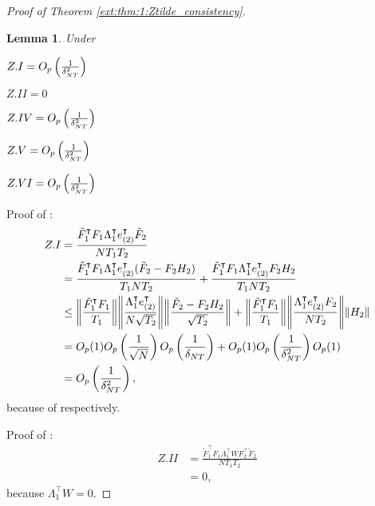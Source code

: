\documentclass[12pt]{article}
\newtheorem{lemma}{Lemma}
\newcommand*{\tran}{\intercal}
\theoremstyle{plain}
\numberwithin{equation}{section}
\begin{document}
\begin{proof}[Proof of Theorem \ref{ext:thm:1:Ztilde_consistency}]
\begin{lemma}
\label{lem:ztilde_consistency_z}
Under 
\begin{lemenum}
\item \label{lem:ztilde_consistency_z:1} 
$Z.I = O_p\left( \frac{1}{\delta_{NT}^2}\right)$
\item \label{lem:ztilde_consistency_z:2}
$Z.II = 0$
\item \label{lem:ztilde_consistency_z:4}
$Z.IV = O_p\left( \frac{1}{\delta_{NT}^2}\right)$
\item \label{lem:ztilde_consistency_z:5}
$Z.V = O_p\left( \frac{1}{\delta_{NT}^2}\right)$
\item \label{lem:ztilde_consistency_z:6}
$Z.VI = O_p\left( \frac{1}{\delta_{NT}^2}\right)$
\end{lemenum}
\end{lemma}
Proof of :
\begin{align*}
Z.I &= 
\frac{\tilde{F}_1^\tran F_1 \Lambda_1^\tran e_{(2)}^\tran \tilde{F}_2}{N T_1 T_2} \\
&= \frac{\tilde{F}_1^\tran F_1 \Lambda_1^\tran e_{(2)}^\tran (\tilde{F}_2 - F_2 H_2)}{T_1 N T_2} + \frac{\tilde{F}_1^\tran F_1 \Lambda_1^\tran e_{(2)}^\tran F_2 H_2}{T_1 N T_2} \\
&\leq \norm{\frac{\tilde{F}_1^\tran F_1}{T_1}} 
\norm{\frac{\Lambda_1^\tran e_{(2)}^\tran}{N \sqrt{T_2}}} 
\norm{\frac{\tilde{F}_2 - F_2 H_2}{\sqrt{T_2}}} + 
\norm{\frac{\tilde{F}_1^\tran F_1}{T_1}} 
\norm{\frac{\Lambda_1^\tran e_{(2)}^\tran F_2}{N T_2}} 
\norm{H_2} \\
&= O_p(1) \OprtN \Opdelta + 
O_p(1) \Opdeltasq O_p(1) \\
&= \Opdeltasq,
\end{align*}
because of  respectively.

Proof of :
\begin{align*}
Z.II &= \frac{\tilde{F}_1^\tran F_1 \Lambda_1^\tran W F_2^\tran \tilde{F}_2}{N T_1 T_2} \\
&= 0,
\end{align*}
because $\Lambda_1^\tran W = 0$.


\end{proof}
\end{document}
